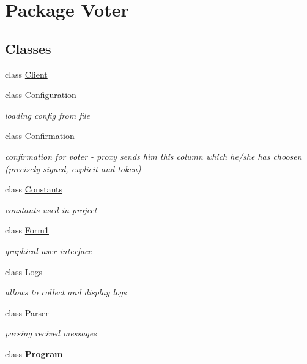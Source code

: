 \hypertarget{namespace_voter}{}\section{Package Voter}
\label{namespace_voter}
\subsection*{Classes}
\begin{DoxyCompactItemize}
\item 
class \hyperlink{class_voter_1_1_client}{Client}
\item 
class \hyperlink{class_voter_1_1_configuration}{Configuration}
\begin{DoxyCompactList}\small\item\em loading config from file \end{DoxyCompactList}\item 
class \hyperlink{class_voter_1_1_confirmation}{Confirmation}
\begin{DoxyCompactList}\small\item\em confirmation for voter -\/ proxy sends him this column which he/she has choosen (precisely signed, explicit and token) \end{DoxyCompactList}\item 
class \hyperlink{class_voter_1_1_constants}{Constants}
\begin{DoxyCompactList}\small\item\em constants used in project \end{DoxyCompactList}\item 
class \hyperlink{class_voter_1_1_form1}{Form1}
\begin{DoxyCompactList}\small\item\em graphical user interface \end{DoxyCompactList}\item 
class \hyperlink{class_voter_1_1_logs}{Logs}
\begin{DoxyCompactList}\small\item\em allows to collect and display logs \end{DoxyCompactList}\item 
class \hyperlink{class_voter_1_1_parser}{Parser}
\begin{DoxyCompactList}\small\item\em parsing recived messages \end{DoxyCompactList}\item 
class {\bfseries Program}

\end{DoxyCompactItemize}
